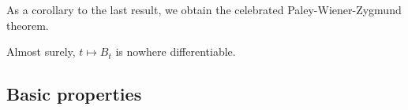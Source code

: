 As a corollary to the last result, we obtain the celebrated Paley-Wiener-Zygmund theorem.

\begin{corollary}
Almost surely, $t \mapsto B_t$ is nowhere differentiable.
\end{corollary}

\subsection{Basic properties}








